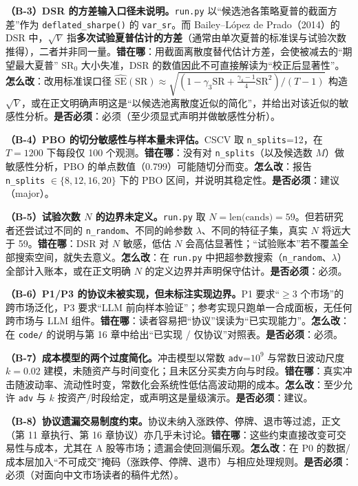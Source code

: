 \documentclass[11pt,a4paper]{ctexart}
\begin{document}
\textbf{（B-3）DSR 的方差输入口径未说明。}\texttt{run.py} 以“候选池各策略夏普的截面方差”作为 \texttt{deflated\_sharpe()} 的 \texttt{var\_sr}。而 Bailey--López de Prado（2014）的 DSR 中，$\sqrt{V}$ 指\textbf{多次试验夏普估计的方差}（通常由单次夏普的标准误与试验次数推得），二者并非同一量。\textbf{错在哪}：用截面离散度替代估计方差，会使被减去的“期望最大夏普” $\text{SR}_0$ 大小失准，DSR 的数值因此不可直接解读为“校正后显著性”。\textbf{怎么改}：改用标准误口径 $\widehat{\text{SE}}(\text{SR})\approx\sqrt{(1-\gamma_3\text{SR}+\frac{\gamma_4-1}{4}\text{SR}^2)/(T-1)}$ 构造 $\sqrt{V}$，或在正文明确声明这是“以候选池离散度近似的简化”，并给出对该近似的敏感性分析。\textbf{是否必须}：必须（至少须显式声明并做敏感性分析）。

\textbf{（B-4）PBO 的切分敏感性与样本量未评估。}CSCV 取 \texttt{n\_splits}=12，在 $T=1200$ 下每段仅 100 个观测。\textbf{错在哪}：没有对 \texttt{n\_splits}（以及候选数 $M$）做敏感性分析，PBO 的单点数值（0.799）可能随切分而变。\textbf{怎么改}：报告 \texttt{n\_splits} $\in\{8,12,16,20\}$ 下的 PBO 区间，并说明其稳定性。\textbf{是否必须}：建议（major）。

\textbf{（B-5）试验次数 $N$ 的边界未定义。}\texttt{run.py} 取 $N=\text{len(cands)}=59$。但若研究者还尝试过不同的 \texttt{n\_random}、不同的岭参数 $\lambda$、不同的特征子集，真实 $N$ 将远大于 59。\textbf{错在哪}：DSR 对 $N$ 敏感，低估 $N$ 会高估显著性；“试验账本”若不覆盖全部搜索空间，就失去意义。\textbf{怎么改}：在 \texttt{run.py} 中把超参数搜索（\texttt{n\_random}、$\lambda$）全部计入账本，或在正文明确 $N$ 的定义边界并声明保守估计。\textbf{是否必须}：必须。

\textbf{（B-6）P1/P3 的协议未被实现，但未标注实现边界。}P1 要求“$\geq 3$ 个市场”的跨市场泛化，P3 要求“LLM 前向样本验证”；参考实现只跑单一合成面板，无任何跨市场与 LLM 组件。\textbf{错在哪}：读者容易把“协议”误读为“已实现能力”。\textbf{怎么改}：在 \texttt{code/} 的说明与第 16 章中给出“已实现 / 仅协议”对照表。\textbf{是否必须}：必须。

\textbf{（B-7）成本模型的两个过度简化。}冲击模型以常数 \texttt{adv}=$10^9$ 与常数日波动尺度 $k=0.02$ 建模，未随资产与时间变化；且未区分买卖方向与时段。\textbf{错在哪}：真实冲击随波动率、流动性时变，常数化会系统性低估高波动期的成本。\textbf{怎么改}：至少允许 \texttt{adv} 与 $k$ 按资产/时段给定，或声明这是量级演示。\textbf{是否必须}：建议。

\textbf{（B-8）协议遗漏交易制度约束。}协议未纳入涨跌停、停牌、退市等过滤，正文（第 11 章执行、第 16 章协议）亦几乎未讨论。\textbf{错在哪}：这些约束直接改变可交易性与成本，尤其在 A 股等市场；遗漏会使回测偏乐观。\textbf{怎么改}：在 P0 的数据/成本层加入“不可成交”掩码（涨跌停、停牌、退市）与相应处理规则。\textbf{是否必须}：必须（对面向中文市场读者的稿件尤然）。
\end{document}
